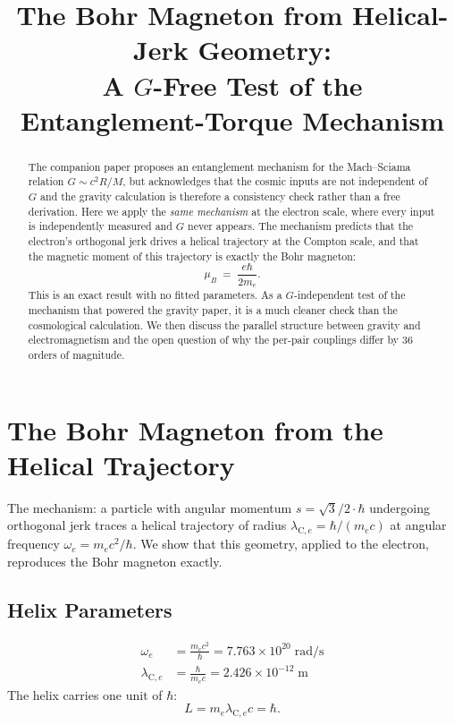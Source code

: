 \documentclass[11pt,letterpaper]{article}
\title{The Bohr Magneton from Helical-Jerk Geometry:\\
A \texorpdfstring{$G$}{G}-Free Test of the Entanglement-Torque Mechanism}
\author{}
\date{}
\newcommand{\lambdace}{\lambda_{\mathrm{C},e}}
\begin{document}
\maketitle

\begin{abstract}
The companion paper proposes an entanglement mechanism for the
Mach--Sciama relation $G \sim c^2 R/M$, but acknowledges that the
cosmic inputs are not independent of $G$ and the gravity calculation
is therefore a consistency check rather than a free derivation. Here
we apply the \emph{same mechanism} at the electron scale, where every
input is independently measured and $G$ never appears. The mechanism
predicts that the electron's orthogonal jerk drives a helical
trajectory at the Compton scale, and that the magnetic moment of this
trajectory is exactly the Bohr magneton:
\begin{equation}
  \mu_B \;=\; \frac{e \hbar}{2 m_e}.
\end{equation}
This is an exact result with no fitted parameters. As a
$G$-independent test of the mechanism that powered the gravity paper,
it is a much cleaner check than the cosmological calculation. We then
discuss the parallel structure between gravity and electromagnetism
and the open question of why the per-pair couplings differ by 36
orders of magnitude.
\end{abstract}

\section{The Bohr Magneton from the Helical Trajectory}

The mechanism: a particle with angular momentum $s = \sqrt{3}/2 \cdot
\hbar$ undergoing orthogonal jerk traces a helical trajectory of radius
$\lambdace = \hbar/(m_e c)$ at angular frequency $\omega_e = m_e c^2/\hbar$.
We show that this geometry, applied to the electron, reproduces the
Bohr magneton exactly.

\subsection{Helix Parameters}

\begin{align}
  \omega_e &= \frac{m_e c^2}{\hbar}
            = 7.763 \times 10^{20}\; \mathrm{rad/s} \\
  \lambdace &= \frac{\hbar}{m_e c}
             = 2.426 \times 10^{-12}\; \mathrm{m}
\end{align}
The helix carries one unit of $\hbar$:
\begin{equation}
  L = m_e \lambdace c = \hbar.
\end{equation}
\end{document}
